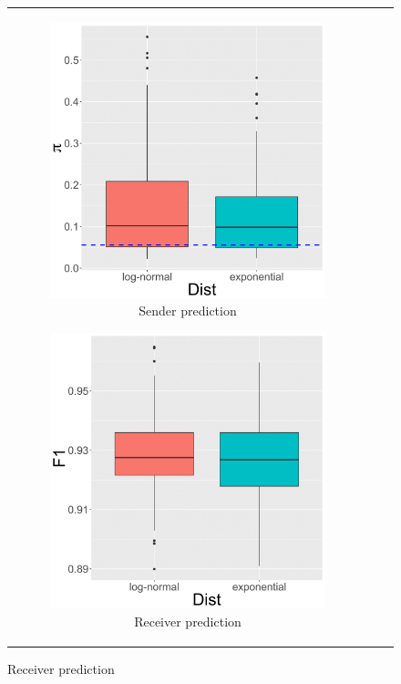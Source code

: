 \documentclass[ba]{imsart}
\numberwithin{equation}{section}
\theoremstyle{plain}
\begin{document}
		\begin{figure}[!t]
			\centering
			\begin{tabular}[t]{ccc}
				\begin{subfigure}[b]{0.33\textwidth}
					\caption{Sender prediction}
					\includegraphics[width=\textwidth]{img/senderpredict-1.png}	
				\end{subfigure}
				\begin{subfigure}[b]{0.33\textwidth}
					\caption{Receiver prediction}
					\includegraphics[width=\textwidth]{img/receiverpredict-1.png}	

\end{subfigure}
\end{tabular}
\end{figure}
\end{document}
